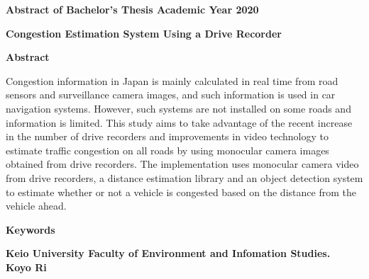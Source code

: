 \begin{center}
\textbf{\large Abstract of Bachelor's Thesis Academic Year 2020}

\vspace{6mm}

\textbf{\large Congestion Estimation System Using a Drive Recorder}

\end{center}

\vspace{10mm}


\begin{flushleft}
\textbf{Abstract}\\
\end{flushleft}
Congestion information in Japan is mainly calculated in real time from road sensors and surveillance camera images, and such information is used in car navigation systems. However, such systems are not installed on some roads and information is limited. This study aims to take advantage of the recent increase in the number of drive recorders and improvements in video technology to estimate traffic congestion on all roads by using monocular camera images obtained from drive recorders. The implementation uses monocular camera video from drive recorders, a distance estimation library and an object detection system to estimate whether or not a vehicle is congested based on the distance from the vehicle ahead.

\begin{flushleft}
\textbf{Keywords}\\
\textbf{}
\end{flushleft}

\begin{flushright}
\textbf{Keio University Faculty of Environment and Infomation Studies.}\\
\textbf{Koyo Ri}\\
\end{flushright}
